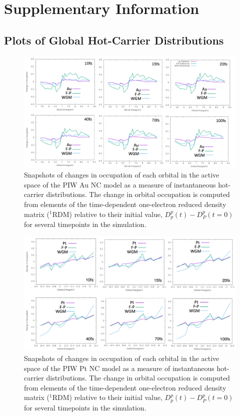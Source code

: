 \documentclass[journal=jpclcd,manuscript=letter]{achemso}
\begin{document}
\newpage
\section{Supplementary Information}

\subsection{Plots of Global Hot-Carrier Distributions}

\begin{figure}
\begin{center}
\includegraphics[width=6in]{figs/Au_HotElectronDistribution_Comparison.png}
\caption{Snapshots of changes in occupation of each orbital in the active space of the PIW Au NC model as a measure of instantaneous hot-carrier distributions.
The change in orbital occupation is computed from elements of the time-dependent one-electron reduced density matrix ($^1$RDM) relative to
their initial value, $D_p^p(t)-D_P^p(t=0)$ for several timepoints in the simulation.}
\end{center}
\end{figure}


\begin{figure}
\begin{center}
\includegraphics[width=6in]{figs/Pt_HotElectronDistribution_Comparison.png}
\caption{Snapshots of changes in occupation of each orbital in the active space of the PIW Pt NC model as a measure of instantaneous hot-carrier distributions.
The change in orbital occupation is computed from elements of the time-dependent one-electron reduced density matrix ($^1$RDM) relative to
their initial value, $D_p^p(t)-D_P^p(t=0)$ for several timepoints in the simulation.  }
\end{center}
\end{figure}
\end{document}
